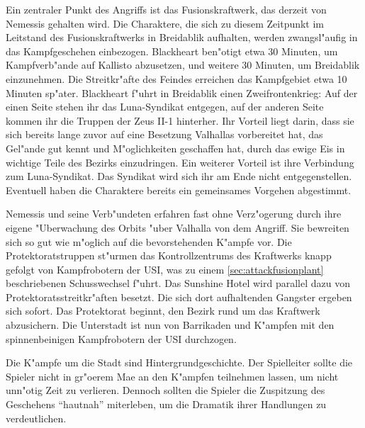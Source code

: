 Ein zentraler Punkt des Angriffs ist das Fusionskraftwerk, das derzeit von Nemessis gehalten wird. Die Charaktere, die sich zu diesem Zeitpunkt im Leitstand des Fusionskraftwerks in Breidablik aufhalten, werden zwangsl"aufig in das Kampfgeschehen einbezogen. Blackheart ben"otigt etwa 30 Minuten, um Kampfverb"ande auf Kallisto abzusetzen, und weitere 30 Minuten, um Breidablik einzunehmen. Die Streitkr"afte des Feindes erreichen das Kampfgebiet etwa 10 Minuten sp"ater. Blackheart f"uhrt in Breidablik einen Zweifrontenkrieg: Auf der einen Seite stehen ihr das Luna-Syndikat entgegen, auf der anderen Seite kommen ihr die Truppen der Zeus II-1 hinterher. Ihr Vorteil liegt darin, dass sie sich bereits lange zuvor auf eine Besetzung Valhallas vorbereitet hat, das Gel"ande gut kennt und M"oglichkeiten geschaffen hat, durch das ewige Eis in wichtige Teile des Bezirks einzudringen. Ein weiterer Vorteil ist ihre Verbindung zum Luna-Syndikat. Das Syndikat wird sich ihr am Ende nicht entgegenstellen. Eventuell haben die Charaktere bereits ein gemeinsames Vorgehen abgestimmt.

Nemessis und seine Verb"undeten erfahren fast ohne Verz"ogerung durch ihre eigene "Uberwachung des Orbits "uber Valhalla von dem Angriff. Sie bewreiten sich so gut wie m"oglich auf die bevorstehenden K"ampfe vor. Die Protektoratstruppen st"urmen das Kontrollzentrums des Kraftwerks knapp gefolgt von Kampfrobotern der USI, was zu einem \cref{sec:attackfusionplant} beschriebenen Schusswechsel f"uhrt. Das Sunshine Hotel wird parallel dazu von Protektoratsstreitkr"aften besetzt. Die sich dort aufhaltenden Gangster ergeben sich sofort. Das Protektorat beginnt, den Bezirk rund um das Kraftwerk abzusichern. Die Unterstadt ist nun von Barrikaden und K"ampfen mit den spinnenbeinigen Kampfrobotern der USI durchzogen.

\begin{remarks}
	Die K"ampfe um die Stadt sind Hintergrundgeschichte. Der Spielleiter sollte die Spieler nicht in gr"o\3erem Ma\3e an den K"ampfen teilnehmen lassen, um nicht unn"otig Zeit zu verlieren. Dennoch sollten die Spieler die Zuspitzung des Geschehens ``hautnah'' miterleben, um die Dramatik ihrer Handlungen zu verdeutlichen.
 \end{remarks}
